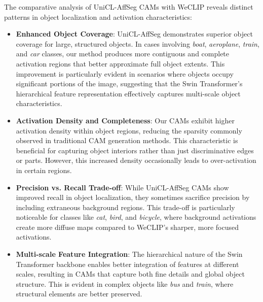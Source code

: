 

The comparative analysis of UniCL-AffSeg CAMs with WeCLIP reveals distinct patterns in object localization and activation characteristics:

\begin{itemize}
    \item \textbf{Enhanced Object Coverage}: UniCL-AffSeg demonstrates superior object coverage for large, structured objects. In cases involving \textit{boat}, \textit{aeroplane}, \textit{train}, and \textit{car} classes, our method produces more contiguous and complete activation regions that better approximate full object extents. This improvement is particularly evident in scenarios where objects occupy significant portions of the image, suggesting that the Swin Transformer's hierarchical feature representation effectively captures multi-scale object characteristics.
    
    \item \textbf{Activation Density and Completeness}: Our CAMs exhibit higher activation density within object regions, reducing the sparsity commonly observed in traditional CAM generation methods. This characteristic is beneficial for capturing object interiors rather than just discriminative edges or parts. However, this increased density occasionally leads to over-activation in certain regions.
    
    \item \textbf{Precision vs. Recall Trade-off}: While UniCL-AffSeg CAMs show improved recall in object localization, they sometimes sacrifice precision by including extraneous background regions. This trade-off is particularly noticeable for classes like \textit{cat}, \textit{bird}, and \textit{bicycle}, where background activations create more diffuse maps compared to WeCLIP's sharper, more focused activations.
    
    \item \textbf{Multi-scale Feature Integration}: The hierarchical nature of the Swin Transformer backbone enables better integration of features at different scales, resulting in CAMs that capture both fine details and global object structure. This is evident in complex objects like \textit{bus} and \textit{train}, where structural elements are better preserved.
\end{itemize}

